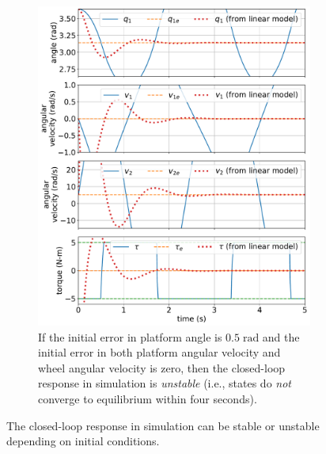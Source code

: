 \documentclass[conf]{new-aiaa}
\begin{document}
\begin{figure}[p]
\begin{subfigure}[t]{0.49\textwidth}
\includegraphics[width=\textwidth]{fig02}
\caption{If the initial error in platform angle is $0.5\;\text{rad}$ and the initial error in both platform angular velocity and wheel angular velocity is zero, then the closed-loop response in simulation is {\em unstable} (i.e., states do {\em not} converge to equilibrium within four seconds).}
\label{fig-unstable}
\end{subfigure}
\caption{The closed-loop response in simulation can be stable or unstable depending on initial conditions.}
\label{fig-examples}
\end{figure}
\end{document}
